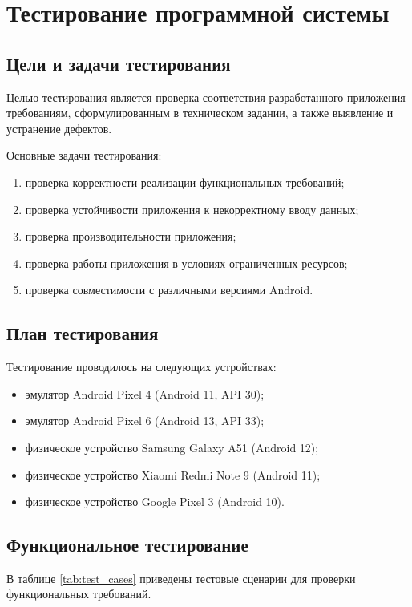 \section{Тестирование программной системы}

\subsection{Цели и задачи тестирования}

Целью тестирования является проверка соответствия разработанного приложения требованиям, сформулированным в техническом задании, а также выявление и устранение дефектов.

Основные задачи тестирования:
\begin{enumerate}
	\item проверка корректности реализации функциональных требований;
	\item проверка устойчивости приложения к некорректному вводу данных;
	\item проверка производительности приложения;
	\item проверка работы приложения в условиях ограниченных ресурсов;
	\item проверка совместимости с различными версиями Android.
\end{enumerate}

\subsection{План тестирования}

Тестирование проводилось на следующих устройствах:
\begin{itemize}
	\item эмулятор Android Pixel 4 (Android 11, API 30);
	\item эмулятор Android Pixel 6 (Android 13, API 33);
	\item физическое устройство Samsung Galaxy A51 (Android 12);
	\item физическое устройство Xiaomi Redmi Note 9 (Android 11);
	\item физическое устройство Google Pixel 3 (Android 10).
\end{itemize}

\subsection{Функциональное тестирование}

В таблице \ref{tab:test_cases} приведены тестовые сценарии для проверки функциональных требований.

